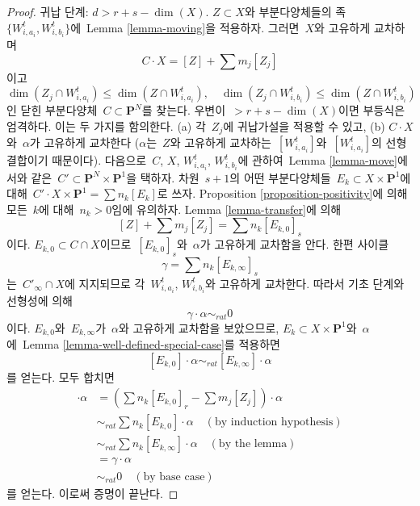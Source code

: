 \begin{proof}
\medskip\noindent
귀납 단계: $d >  r + s - \dim(X)$.
$Z \subset X$와 부분다양체들의 족\ 
$\{W_{i, a_i}^t, W_{i, b_i}^t\}$에\  Lemma
\ref{lemma-moving}을 적용하자. 그러면\  $X$와 고유하게 교차하며
$$
C \cdot X = [Z] + \sum m_j [Z_j]
$$
이고
$$
\dim(Z_j \cap W_{i, a_i}^t) \leq \dim(Z \cap W_{i, a_i}^t),\quad
\dim(Z_j \cap W_{i, b_i}^t) \leq \dim(Z \cap W_{i, b_i}^t)
$$
인 닫힌 부분다양체\  $C \subset \mathbf{P}^N$를 찾는다.
우변이\  $> r + s - \dim(X)$이면 부등식은 엄격하다.
이는 두 가지를 함의한다. (a) 각\  $Z_j$에 귀납가설을 적용할 수 있고,
(b) $C \cdot X$와\  $\alpha$가 고유하게 교차한다
($\alpha$는\  $Z$와 고유하게 교차하는\ 
$[W_{i, a_i}^t]$와\  $[W_{i, a_i}^t]$의 선형결합이기 때문이다).
다음으로\  $C$, $X$, $W_{i, a_i}^t$, $W_{i, b_i}^t$에 관하여\ 
Lemma \ref{lemma-move}에서와 같은\ 
$C' \subset \mathbf{P}^N \times \mathbf{P}^1$을 택하자.
차원\  $s + 1$의 어떤 부분다양체들\ 
$E_k \subset X \times \mathbf{P}^1$에 대해\ 
$C' \cdot X \times \mathbf{P}^1 = \sum n_k [E_k]$로 쓰자.
Proposition \ref{proposition-positivity}에 의해 모든\  $k$에 대해\ 
$n_k > 0$임에 유의하자. Lemma \ref{lemma-transfer}에 의해
$$
[Z] + \sum m_j [Z_j] = \sum n_k[E_{k, 0}]_s
$$
이다. $E_{k, 0} \subset C \cap X$이므로\ 
$[E_{k, 0}]_s$와\  $\alpha$가 고유하게 교차함을 안다.
한편 사이클
$$
\gamma = \sum n_k[E_{k, \infty}]_s
$$
는\  $C'_\infty \cap X$에 지지되므로 각\ 
$W_{i, a_i}^t$, $W_{i, b_i}^t$와 고유하게 교차한다.
따라서 기초 단계와 선형성에 의해
$$
\gamma \cdot \alpha \sim_{rat} 0
$$
이다. $E_{k, 0}$와\  $E_{k, \infty}$가\  $\alpha$와 고유하게
교차함을 보았으므로, $E_k \subset X \times \mathbf{P}^1$와\ 
$\alpha$에\  Lemma \ref{lemma-well-defined-special-case}를 적용하면
$$
[E_{k, 0}] \cdot \alpha \sim_{rat} [E_{k, \infty}] \cdot \alpha
$$
를 얻는다. 모두 합치면
\begin{align*}
[Z] \cdot \alpha
& =
(\sum n_k[E_{k, 0}]_r - \sum m_j[Z_j]) \cdot \alpha \\
& \sim_{rat}
\sum n_k [E_{k, 0}] \cdot \alpha \quad (\text{by induction hypothesis})\\
& \sim_{rat}
\sum n_k [E_{k, \infty}] \cdot \alpha \quad (\text{by the lemma})\\
& =
\gamma \cdot \alpha \\
& \sim_{rat}
0 \quad (\text{by base case})
\end{align*}
를 얻는다. 이로써 증명이 끝난다.
\end{proof}


